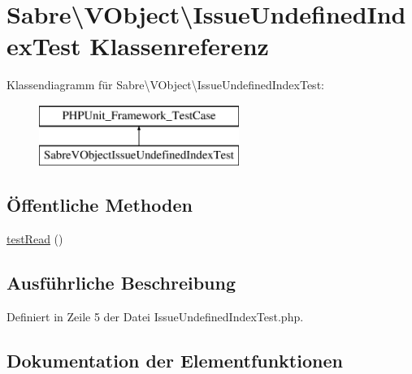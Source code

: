 \hypertarget{class_sabre_1_1_v_object_1_1_issue_undefined_index_test}{}\section{Sabre\textbackslash{}V\+Object\textbackslash{}Issue\+Undefined\+Index\+Test Klassenreferenz}
\label{class_sabre_1_1_v_object_1_1_issue_undefined_index_test}
Klassendiagramm für Sabre\textbackslash{}V\+Object\textbackslash{}Issue\+Undefined\+Index\+Test\+:\begin{figure}[H]
\begin{center}
\leavevmode
\includegraphics[height=2.000000cm]{class_sabre_1_1_v_object_1_1_issue_undefined_index_test}
\end{center}
\end{figure}
\subsection*{Öffentliche Methoden}
\begin{DoxyCompactItemize}
\item 
\mbox{\hyperlink{class_sabre_1_1_v_object_1_1_issue_undefined_index_test_abed5543a1ba8c354ef84993c751f3668}{test\+Read}} ()
\end{DoxyCompactItemize}


\subsection{Ausführliche Beschreibung}


Definiert in Zeile 5 der Datei Issue\+Undefined\+Index\+Test.\+php.



\subsection{Dokumentation der Elementfunktionen}
\mbox{\label{class_sabre_1_1_v_object_1_1_issue_undefined_index_test_abed5543a1ba8c354ef84993c751f3668}} 
